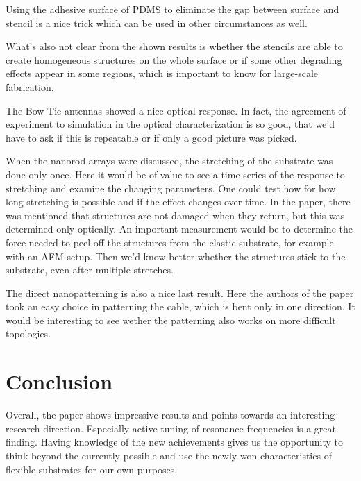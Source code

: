 \documentclass[journal, a4paper]{IEEEtran}
\begin{document}
Using the adhesive surface of PDMS to eliminate the gap between surface and stencil is a nice trick which can be used in other circumstances as well. 

What's also not clear from the shown results is whether the stencils are able to create homogeneous structures on the whole surface or if some other degrading effects appear in some regions, which is important to know for large-scale fabrication.

The Bow-Tie antennas showed a nice optical response. In fact, the agreement of experiment to simulation in the optical characterization is so good, that we'd have to ask if this is repeatable or if only a good picture was picked.

When the nanorod arrays were discussed, the stretching of the substrate was done only once. Here it would be of value to see a time-series of the response to stretching and examine the changing parameters. One could test how for how long stretching is possible and if the effect changes over time. In the paper, there was mentioned that structures are not damaged when they return, but this was determined only optically. An important measurement would be to determine the force needed to peel off the structures from the elastic substrate, for example with an AFM-setup. Then we'd know better whether the structures stick to the substrate, even after multiple stretches.

The direct nanopatterning is also a nice last result. Here the authors of the paper took an easy choice in patterning the cable, which is bent only in one direction. It would be interesting to see wether the patterning also works on more difficult topologies. 



\section{Conclusion}
Overall, the paper shows impressive results and points towards an interesting research direction. Especially active tuning of resonance frequencies is a great finding.
Having knowledge of the new achievements gives us the opportunity to think beyond the currently possible and use the newly won characteristics of flexible substrates for our own purposes. 


\end{document}
